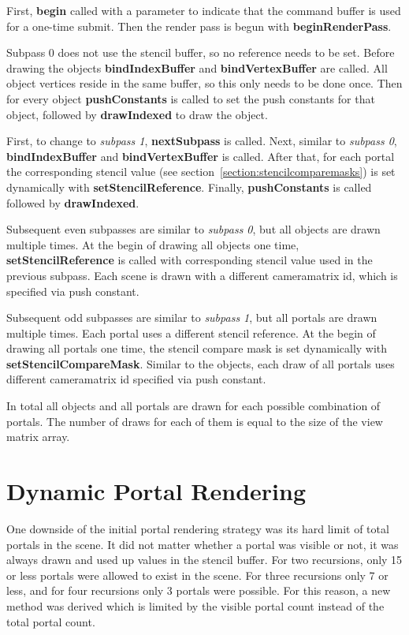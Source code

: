 First, \textbf{begin} called with a parameter to indicate that the command buffer is used for a one-time submit. Then the render pass is begun with \textbf{beginRenderPass}.


Subpass 0 does not use the stencil buffer, so no reference needs to be set. Before drawing the objects \textbf{bindIndexBuffer} and \textbf{bindVertexBuffer} are called. All object vertices reside in the same buffer, so this only needs to be done once. Then for every object \textbf{pushConstants} is called to set the push constants for that object, followed by \textbf{drawIndexed} to draw the object. 

First, to change to \textit{subpass 1}, \textbf{nextSubpass} is called. Next, similar to \textit{subpass 0}, \textbf{bindIndexBuffer} and \textbf{bindVertexBuffer} is called. After that, for each portal the corresponding stencil value (see section~\ref{section:stencilcomparemasks}) is set dynamically with \textbf{setStencilReference}. Finally, \textbf{pushConstants} is called followed by \textbf{drawIndexed}.

Subsequent even subpasses are similar to \textit{subpass 0}, but all objects are drawn multiple times. At the begin of drawing all objects one time, \textbf{setStencilReference} is called with corresponding stencil value used in the previous subpass. Each scene is drawn with a different \gls{cameramatrix} id, which is specified via push constant. 

Subsequent odd subpasses are similar to \textit{subpass 1}, but all portals are drawn multiple times. Each portal uses a different stencil reference.  At the begin of drawing all portals one time, the stencil compare mask is set dynamically with \textbf{setStencilCompareMask}. Similar to the objects, each draw of all portals uses different \gls{cameramatrix} id specified via push constant. 

In total all objects and all portals are drawn for each possible combination of portals. The number of draws for each of them is equal to the size of the view matrix array.


\section{Dynamic Portal Rendering}
One downside of the initial portal rendering strategy was its hard limit of total portals in the scene. It did not matter whether a portal was visible or not, it was always drawn and used up values in the stencil buffer. For two recursions, only 15 or less portals were allowed to exist in the scene. For three recursions only 7 or less, and for four recursions only 3 portals were possible. For this reason, a new method was derived which is limited by the visible portal count instead of the total portal count. 

